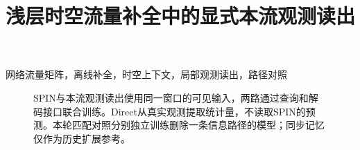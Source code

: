 \documentclass[conference,10pt,letterpaper]{IEEEtran}
\title{浅层时空流量补全中的显式本流观测读出}
\author{\IEEEauthorblockN{作者信息待填写}
\IEEEauthorblockA{中文内部研究初稿\quad 2026 年 9 月 17 日}}
\begin{document}
\maketitle
\begin{abstract}

\end{abstract}
\begin{IEEEkeywords}
网络流量矩阵，离线补全，时空上下文，局部观测读出，路径对照
\end{IEEEkeywords}

\begin{figure}[t]
\centering

\caption{SPIN与本流观测读出使用同一窗口的可见输入，两路通过查询和解码接口联合训练。Direct从真实观测提取统计量，不读取SPIN的预测。本轮匹配对照分别独立训练删除一条信息路径的模型；同步记忆仅作为历史扩展参考。}
\label{fig:architecture}
\end{figure}







\end{document}
